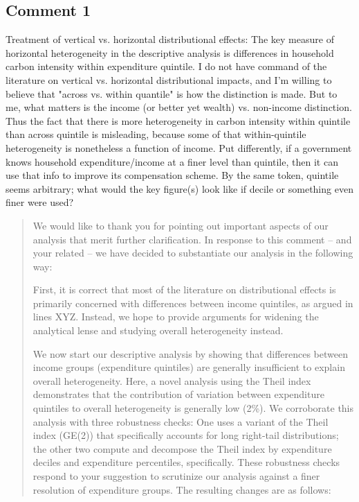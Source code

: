 \documentclass[11pt]{article}
\newenvironment{response}
{\begin{quote}\color{black}}
{\end{quote}}
\begin{document}
\subsection*{Comment 1}\label{comment_R1_1}

\begin{commentbox}
    Treatment of vertical vs. horizontal distributional effects: The key measure of horizontal heterogeneity in the descriptive analysis is differences in household carbon intensity within expenditure quintile. I do not have command of the literature on vertical vs. horizontal distributional impacts, and I'm willing to believe that "across vs. within quantile" is how the distinction is made. But to me, what matters is the income (or better yet wealth) vs. non-income distinction. Thus the fact that there is more heterogeneity in carbon intensity within quintile than across quintile is misleading, because some of that within-quintile heterogeneity is nonetheless a function of income. Put differently, if a government knows household expenditure/income at a finer level than quintile, then it can use that info to improve its compensation scheme. By the same token, quintile seems arbitrary; what would the key figure(s) look like if decile or something even finer were used?
\end{commentbox}

\begin{response}

We would like to thank you for pointing out important aspects of our analysis that merit further clarification. In response to this comment -- and your related  -- we have decided to substantiate our analysis in the following way:

First, it is correct that most of the literature on distributional effects is primarily concerned with differences between income quintiles, as argued in lines XYZ. Instead, we hope to provide arguments for widening the analytical lense and studying overall heterogeneity instead. 

We now start our descriptive analysis by showing that differences between income groups (expenditure quintiles) are generally insufficient to explain overall heterogeneity. Here, a novel analysis using the Theil index demonstrates that the contribution of variation between expenditure quintiles to overall heterogeneity is generally low (2\%). We corroborate this analysis with three robustness checks: One uses a variant of the Theil index (GE(2)) that specifically accounts for long right-tail distributions; the other two compute and decompose the Theil index by expenditure deciles and expenditure percentiles, specifically. These robustness checks respond to your suggestion to scrutinize our analysis against a finer resolution of expenditure groups. The resulting changes are as follows:

\end{response}
\end{document}
